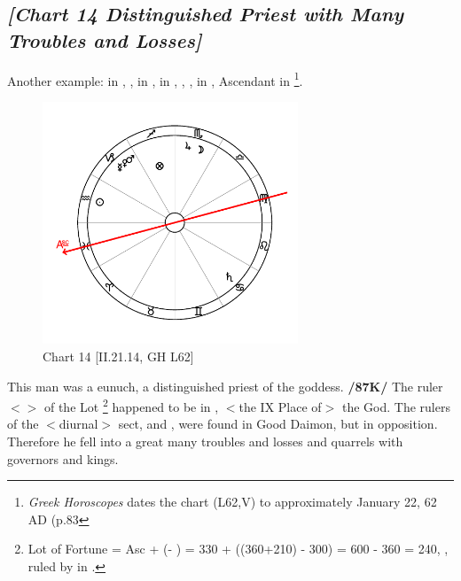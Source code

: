 \newpage
\subsection*{\textit{[Chart 14 Distinguished Priest with Many Troubles and Losses]}}

Another example: \Sun\xspace in \Aquarius, \Moon, \Jupiter\xspace in \Scorpio, \Saturn\xspace in \Cancer, \Mars, \Venus, \Mercury\xspace in \Capricorn, Ascendant in \Pisces
\footnote{\textit{Greek Horoscopes} dates the chart (L62,V) to approximately January 22, 62 AD (p.83}.

\clearpage
\begin{figure}
\centering
\vspace{-20pt}
\includegraphics[width=0.68\textwidth]{charts/2_21_14}
\caption{Chart 14 [II.21.14, GH L62]}
\label{fig:chart14}
\end{figure}

This man was a eunuch, a distinguished priest of the goddess. \textbf{/87K/} The ruler $<$\Jupiter$>$ of the Lot
\footnote{Lot of Fortune = Asc + (\Moon\xspace\xspace - \Sun) = 330 + ((360+210) - 300) = 600 - 360 = 240, \Sagittarius, ruled by \Jupiter\xspace in \Scorpio.}
 happened to be in \Scorpio, $<$the IX Place of$>$ the God. The rulers of the $<$diurnal$>$ sect, \Saturn\xspace and \Mercury, were found in Good Daimon, but in opposition. Therefore he fell into a great many troubles and losses and quarrels with governors and kings.

\newpage